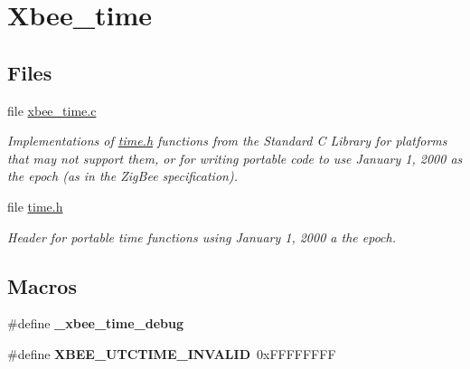 \hypertarget{group__xbee__time}{\section{Xbee\-\_\-time}
\label{group__xbee__time}
}
\subsection*{Files}
\begin{DoxyCompactItemize}
\item 
file \hyperlink{xbee__time_8c}{xbee\-\_\-time.\-c}
\begin{DoxyCompactList}\small\item\em Implementations of \hyperlink{time_8h}{time.\-h} functions from the Standard C Library for platforms that may not support them, or for writing portable code to use January 1, 2000 as the epoch (as in the Zig\-Bee specification). \end{DoxyCompactList}\item 
file \hyperlink{time_8h}{time.\-h}
\begin{DoxyCompactList}\small\item\em Header for portable time functions using January 1, 2000 a the epoch. \end{DoxyCompactList}\end{DoxyCompactItemize}
\subsection*{Macros}
\begin{DoxyCompactItemize}
\item 
\hypertarget{group__xbee__time_ga403c3fdc8bbbe38ae7f31f92b5b0eebf}{\#define {\bfseries \-\_\-xbee\-\_\-time\-\_\-debug}}\label{group__xbee__time_ga403c3fdc8bbbe38ae7f31f92b5b0eebf}

\item 
\hypertarget{group__xbee__time_gaff9233a38930ed8e37c64e6b39f33b43}{\#define {\bfseries X\-B\-E\-E\-\_\-\-U\-T\-C\-T\-I\-M\-E\-\_\-\-I\-N\-V\-A\-L\-I\-D}~0x\-F\-F\-F\-F\-F\-F\-F\-F}\label{group__xbee__time_gaff9233a38930ed8e37c64e6b39f33b43}

\end{DoxyCompactItemize}
